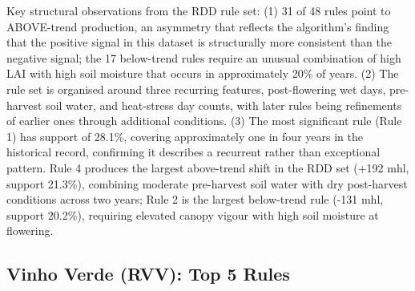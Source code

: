 Key structural observations from the RDD rule set: (1) 31 of 48 rules point to ABOVE-trend production, an asymmetry that reflects the algorithm's finding that the positive signal in this dataset is structurally more consistent than the negative signal; the 17 below-trend rules require an unusual combination of high LAI with high soil moisture that occurs in approximately 20\% of years. (2) The rule set is organised around three recurring features, post-flowering wet days, pre-harvest soil water, and heat-stress day counts, with later rules being refinements of earlier ones through additional conditions. (3) The most significant rule (Rule 1) has support of 28.1\%, covering approximately one in four years in the historical record, confirming it describes a recurrent rather than exceptional pattern. Rule 4 produces the largest above-trend shift in the RDD set (+192 mhl, support 21.3\%), combining moderate pre-harvest soil water with dry post-harvest conditions across two years; Rule 2 is the largest below-trend rule (-131 mhl, support 20.2\%), requiring elevated canopy vigour with high soil moisture at flowering.


\subsection{Vinho Verde (RVV): Top 5 Rules}\label{sub:vinho_verde_rvv_top}

